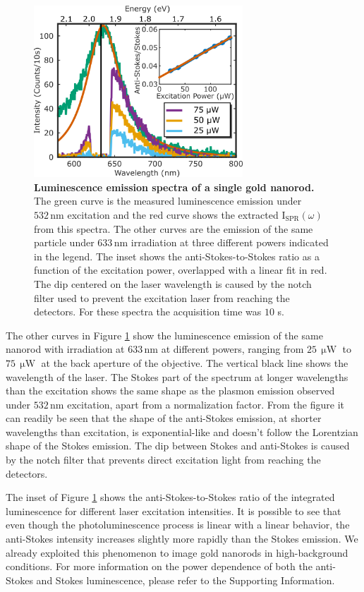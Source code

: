 \documentclass[journal=nalefd,manuscript=letter]{achemso}
\newcommand{\HI}[1]{{#1}} %
\newcommand{\nm}{\ensuremath{\,\textrm{nm}}}
\newcommand{\uW}{\ensuremath{\,\upmu\textrm{W}}}
\begin{document}
\begin{figure}[tp] \centering
\includegraphics[width=78.4mm]{Figures/02_Several_Intensities/02_several_intensities.png}
\caption{\textbf{Luminescence emission spectra of a single gold nanorod.} The green curve is the
measured luminescence emission under $532\nm$ excitation \HI{and the red curve shows the 
extracted $\textrm{I}_{\textrm{SPR}}(\omega)$ from this spectra.}
The other curves are the emission of the same particle under $633\nm$ irradiation at three 
different powers indicated in the legend. The inset shows the anti-Stokes-to-Stokes ratio as a function
of the excitation power, overlapped with a linear fit in red. The dip centered on the laser wavelength
is caused by the notch filter used to prevent the excitation laser from reaching the detectors. For 
these spectra the acquisition time was $10$ s. }
	\label{fig:spectra_intensity}
\end{figure}

The other curves in Figure \ref{fig:spectra_intensity} show the luminescence emission of
the same nanorod with irradiation at $633\nm$ at different powers,
ranging from $25\uW$ to $75\uW$ at the back aperture of the objective.  
The vertical black line shows the wavelength of the laser. The Stokes part of the
spectrum at longer wavelengths than the excitation shows the same shape as the
plasmon emission observed under $532\nm$ excitation, apart from a normalization
factor. From the figure it can readily be seen that the shape of the anti-Stokes
emission, at shorter wavelengths than excitation, is exponential-like and
doesn't follow the Lorentzian shape of the Stokes emission. The dip between
Stokes and anti-Stokes is caused by the notch filter that prevents direct
excitation light from reaching the detectors. 

The inset of Figure \ref{fig:spectra_intensity} shows the anti-Stokes-to-Stokes ratio of
the integrated luminescence for different laser excitation intensities. \HI{It is
possible to see that even though the photoluminescence process is linear with a 
linear behavior, the anti-Stokes intensity increases slightly more rapidly than the Stokes emission.}
We already exploited this phenomenon to image gold nanorods in high-background
conditions\cite{Carattino2016a}. 
For more information on the power dependence of both the anti-Stokes and Stokes luminescence, 
please refer to the Supporting Information. 
\end{document}
